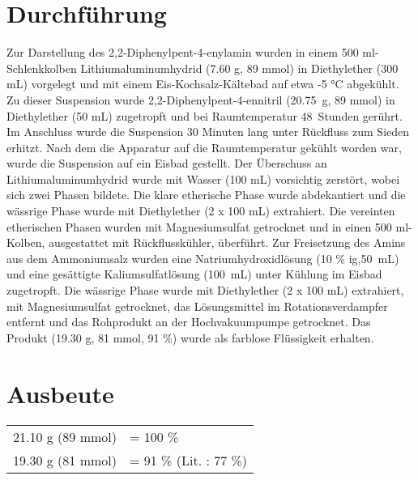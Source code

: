 \documentclass[12pt]{article}
\begin{document}
\begin{onehalfspace}
\normalsize \section{Durchführung \cite{vor}}
Zur Darstellung des 2,2-Diphenylpent-4-enylamin wurden in einem 500 ml-Schlenkkolben
Lithiumaluminumhydrid (7.60 \si{\gram}, 89 \si{\milli\mol}) in Diethylether (300 \si{\milli\liter}) vorgelegt und mit einem Eis-Kochsalz-Kältebad auf etwa -5 \si{\celsius} abgekühlt.
Zu dieser Suspension wurde 2,2-Diphenylpent-4-ennitril (20.75~\si{\gram}, 89 \si{\milli\mol}) in Diethylether (50 \si{\milli\liter}) zugetropft und
 bei Raumtemperatur 48~Stunden gerührt. Im Anschluss wurde die Suspension 30 Minuten lang unter Rückfluss zum Sieden erhitzt.
Nach dem die Apparatur auf die Raumtemperatur gekühlt worden war, wurde die Suspension auf ein Eisbad gestellt.
Der Überschuss an Lithiumaluminumhydrid wurde mit Wasser (100 \si{\milli\liter}) vorsichtig zerstört, wobei sich zwei Phasen bildete.
 Die klare etherische Phase wurde abdekantiert und die wässrige Phase wurde mit Diethylether (2 x 100 \si{\milli\liter}) extrahiert.
  Die vereinten etherischen Phasen wurden mit Magnesiumsulfat getrocknet
und in einen 500 ml-Kolben, ausgestattet mit Rückflusskühler, überführt.
Zur Freisetzung des Amins aus dem Ammoniumsalz wurden eine Natriumhydroxidlösung (10 \% ig,50~\si{\milli\liter}) und eine gesättigte
Kaliumsulfatlösung (100~\si{\milli\liter}) unter Kühlung im Eisbad zugetropft.
Die wässrige Phase wurde mit Diethylether (2 x 100 \si{\milli\liter}) extrahiert, mit Magnesiumsulfat getrocknet, das Lösungsmittel im Rotationsverdampfer entfernt und
 das Rohprodukt an der Hochvakuumpumpe getrocknet. Das Produkt (19.30 \si{\gram}, 81 \si{\milli\mol}, 91 \%) wurde als farblose Flüssigkeit erhalten.

\section{Ausbeute}
\begin{tabular}{ ll}
  21.10 g (89 mmol)   & = 100 \%\\
  19.30 g (81 mmol)    & = 91 \% (Lit.\cite{vor} : 77 \%) \\
 \end{tabular}
\pagebreak



\end{onehalfspace}
\end{document}
